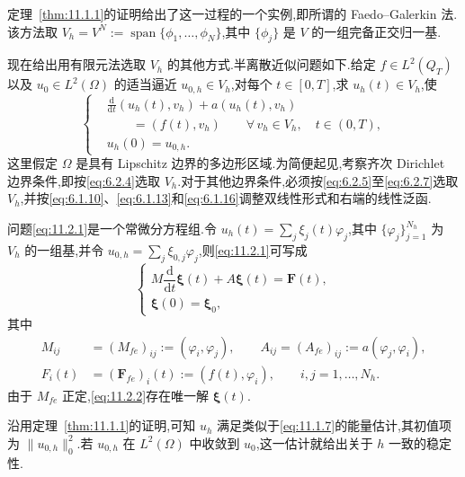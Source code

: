 定理~\ref{thm:11.1.1}的证明给出了这一过程的一个实例,即所谓的 Faedo--Galerkin 法.该方法取 \(V_h=V^N:=\operatorname{span}\{\phi_1,\ldots,\phi_N\}\),其中 \(\{\phi_j\}\) 是 \(V\) 的一组完备正交归一基.

现在给出用有限元法选取 \(V_h\) 的其他方式.半离散近似问题如下.给定 \(f\in L^2(Q_T)\) 以及 \(u_0\in L^2(\Omega)\) 的适当逼近 \(u_{0,h}\in V_h\),对每个 \(t\in[0,T]\),求 \(u_h(t)\in V_h\),使
\begin{equation}\label{eq:11.2.1}
  \left\{
  \begin{aligned}
    &\frac{\mathrm d}{\mathrm dt}(u_h(t),v_h)+a(u_h(t),v_h)\\
    &\qquad=(f(t),v_h)\qquad\forall\,v_h\in V_h,\quad t\in(0,T),\\
    &u_h(0)=u_{0,h}.
  \end{aligned}
  \right.
\end{equation}
这里假定 \(\Omega\) 是具有 Lipschitz 边界的多边形区域.为简便起见,考察齐次 Dirichlet 边界条件,即按\eqref{eq:6.2.4}选取 \(V_h\).对于其他边界条件,必须按\eqref{eq:6.2.5}至\eqref{eq:6.2.7}选取 \(V_h\),并按\eqref{eq:6.1.10}、\eqref{eq:6.1.13}和\eqref{eq:6.1.16}调整双线性形式和右端的线性泛函.

问题\eqref{eq:11.2.1}是一个常微分方程组.令 \(u_h(t)=\sum_j\xi_j(t)\varphi_j\),其中 \(\{\varphi_j\}_{j=1}^{N_h}\) 为 \(V_h\) 的一组基,并令 \(u_{0,h}=\sum_j\xi_{0,j}\varphi_j\),则\eqref{eq:11.2.1}可写成
\begin{equation}\label{eq:11.2.2}
  \begin{cases}
    M\dfrac{\mathrm d}{\mathrm dt}\boldsymbol{\xi}(t)+A\boldsymbol{\xi}(t)=\boldsymbol{F}(t),\\
    \boldsymbol{\xi}(0)=\boldsymbol{\xi}_0,
  \end{cases}
\end{equation}
其中
\[
  \begin{aligned}
    M_{ij}&=(M_{fe})_{ij}:=(\varphi_i,\varphi_j),\qquad
       A_{ij}=(A_{fe})_{ij}:=a(\varphi_j,\varphi_i),\\
    F_i(t)&=(\boldsymbol{F}_{fe})_i(t):=(f(t),\varphi_i),\qquad i,j=1,\ldots,N_h .
  \end{aligned}
\]
由于 \(M_{fe}\) 正定,\eqref{eq:11.2.2}存在唯一解 \(\boldsymbol{\xi}(t)\).

沿用定理~\ref{thm:11.1.1}的证明,可知 \(u_h\) 满足类似于\eqref{eq:11.1.7}的能量估计,其初值项为 \(\|u_{0,h}\|_0^2\).若 \(u_{0,h}\) 在 \(L^2(\Omega)\) 中收敛到 \(u_0\),这一估计就给出关于 \(h\) 一致的稳定性.

